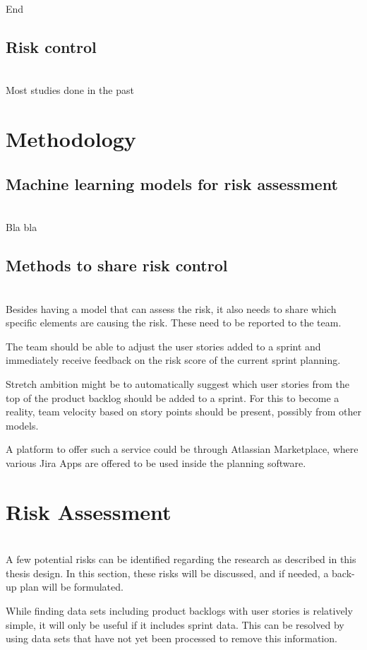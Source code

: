 \documentclass[sigconf]{acmart}
\begin{document}
End\\

\subsection{Risk control} \\
Most studies done in the past   \\


\section{Methodology}

\subsection{Machine learning models for risk assessment}\\
Bla bla

\subsection{Methods to share risk control}\\
Besides having a model that can assess the risk, it also needs to share which specific elements are causing the risk. These need to be reported to the team.

The team should be able to adjust the user stories added to a sprint and immediately receive feedback on the risk score of the current sprint planning.

Stretch ambition might be to automatically suggest which user stories from the top of the product backlog should be added to a sprint. For this to become a reality, team velocity based on story points should be present, possibly from other models.

A platform to offer such a service could be through Atlassian Marketplace, where various Jira Apps are offered to be used inside the planning software.


\section{Risk Assessment}\\
A few potential risks can be identified regarding the research as described in this thesis design. In this section, these risks will be discussed, and if needed, a back-up plan will be formulated.

While finding data sets including product backlogs with user stories is relatively simple, it will only be useful if it includes sprint data. This can be resolved by using data sets that have not yet been processed to remove this information.
\end{document}
